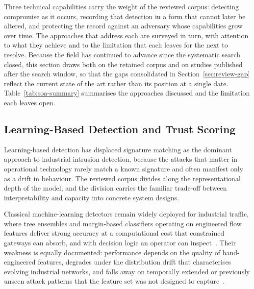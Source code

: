 Three technical capabilities carry the weight of the reviewed corpus: detecting
compromise as it occurs, recording that detection in a form that cannot later be
altered, and protecting the record against an adversary whose capabilities grow
over time. The approaches that address each are surveyed in turn, with attention
to what they achieve and to the limitation that each leaves for the next to
resolve. Because the field has continued to advance since the systematic search
closed, this section draws both on the retained corpus and on studies published
after the search window, so that the gaps consolidated in
Section~\ref{sec:review-gap} reflect the current state of the art rather than its
position at a single date. Table~\ref{tab:soa-summary} summarises the approaches
discussed and the limitation each leaves open.

\subsection{Learning-Based Detection and Trust Scoring}
\label{subsec:soa-learning}

Learning-based detection has displaced signature matching as the dominant
approach to industrial intrusion detection, because the attacks that matter in
operational technology rarely match a known signature and often manifest only as
a drift in behaviour. The reviewed corpus divides along the representational
depth of the model, and the division carries the familiar trade-off between
interpretability and capacity into concrete system designs.

Classical machine-learning detectors remain widely deployed for industrial
traffic, where tree ensembles and margin-based classifiers operating on
engineered flow features deliver strong accuracy at a computational cost that
constrained gateways can absorb, and with decision logic an operator can
inspect~\cite{majidian2024optimizing}. Their weakness is equally documented:
performance depends on the quality of hand-engineered features, degrades under
the distribution drift that characterises evolving industrial networks, and
falls away on temporally extended or previously unseen attack patterns that the
feature set was not designed to capture~\cite{agate2024driftaware,
ennaji2025adversarial}.

